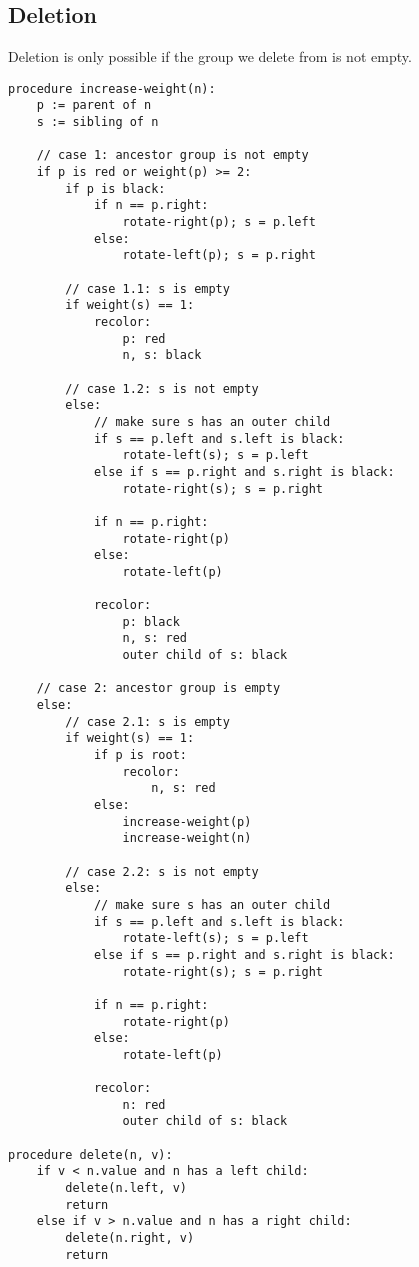 \documentclass{article}
\begin{document}
\subsection{Deletion}
Deletion is only possible if the group we delete from is not empty.

\begin{small}
\begin{verbatim}
procedure increase-weight(n):
    p := parent of n
    s := sibling of n

    // case 1: ancestor group is not empty
    if p is red or weight(p) >= 2:
        if p is black:
            if n == p.right:
                rotate-right(p); s = p.left
            else:
                rotate-left(p); s = p.right

        // case 1.1: s is empty
        if weight(s) == 1:
            recolor:
                p: red
                n, s: black

        // case 1.2: s is not empty
        else:
            // make sure s has an outer child
            if s == p.left and s.left is black:
                rotate-left(s); s = p.left
            else if s == p.right and s.right is black:
                rotate-right(s); s = p.right

            if n == p.right:
                rotate-right(p)
            else:
                rotate-left(p)

            recolor:
                p: black
                n, s: red
                outer child of s: black

    // case 2: ancestor group is empty
    else:
        // case 2.1: s is empty
        if weight(s) == 1:
            if p is root:
                recolor:
                    n, s: red
            else:
                increase-weight(p)
                increase-weight(n)

        // case 2.2: s is not empty
        else:
            // make sure s has an outer child
            if s == p.left and s.left is black:
                rotate-left(s); s = p.left
            else if s == p.right and s.right is black:
                rotate-right(s); s = p.right

            if n == p.right:
                rotate-right(p)
            else:
                rotate-left(p)

            recolor:
                n: red
                outer child of s: black

procedure delete(n, v):
    if v < n.value and n has a left child:
        delete(n.left, v)
        return
    else if v > n.value and n has a right child:
        delete(n.right, v)
        return


\end{verbatim}
\end{small}
\end{document}
